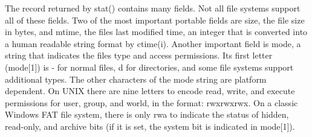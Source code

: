 
The record returned by \textsf{stat()} contains many fields. Not all
file systems support all of these fields. Two of the most important
portable fields are \textsf{size}, the file size in
bytes, and \textsf{mtime}, the file{\textquotesingle}s last
modified time, an integer that is converted
into a human readable string format by \textsf{ctime(i)}. Another
important field is \textsf{mode}, a string that indicates the
file{\textquotesingle}s type and access
permissions. Its first letter (\textsf{mode[1]}) is
\textsf{{\textquotedbl}-{\textquotedbl}} for normal files,
\textsf{{\textquotedbl}d{\textquotedbl}} for directories, and some file
systems support additional types. The other characters of the mode
string are platform dependent. On UNIX there are nine letters to encode
read, write, and execute permissions for user, group, and world, in the
format: \textsf{{\textquotedbl}rwxrwxrwx{\textquotedbl}}. On a classic
Windows FAT file system, there is only
\textsf{{\textquotedbl}rwa{\textquotedbl}} to indicate the status of
hidden, read-only, and archive bits (if it is set, the system bit is
indicated in \textsf{mode[1]}).

